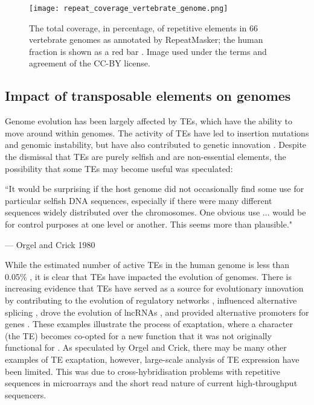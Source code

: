 \begin{figure}[!ht]
   \centering
   \texttt{[image: repeat\_coverage\_vertebrate\_genome.png]}
   \caption[Coverage of repetitive elements in vertebrate genomes]{The total coverage, in percentage, of repetitive elements in 66 vertebrate genomes as annotated by RepeatMasker; the human fraction is shown as a red bar \citep{tang2014repcoverage}. Image used under the terms and agreement of the CC-BY license.}
   \label{fig:repeat_coverage_vertebrate_genome}
\end{figure}

\subsection{Impact of transposable elements on genomes}

Genome evolution has been largely affected by TEs, which have the ability to move around within genomes. The activity of TEs have led to insertion mutations and genomic instability, but have also contributed to genetic innovation \citep{pmid19763152}. Despite the dismissal that TEs are purely selfish and are non-essential elements, the possibility that some TEs may become useful was speculated:

\epigraph{``It would be surprising if the host genome did not occasionally find some use for particular selfish DNA sequences, especially if there were many different sequences widely distributed over the chromosomes. One obvious use $\ldots$ would be for control purposes at one level or another. This seems more than plausible."}{--- \textup{Orgel and Crick 1980}}

While the estimated number of active TEs in the human genome is less than 0.05\% \citep{pmid17331616}, it is clear that TEs have impacted the evolution of genomes. There is increasing evidence that TEs have served as a source for evolutionary innovation by contributing to the evolution of regulatory networks \citep{pmid18368054}, influenced alternative splicing \citep{pmid18818740}, drove the evolution of lncRNAs \citep{pmid23637635}, and provided alternative promoters for genes \citep{pmid19577618}. These examples illustrate the process of exaptation, where a character (the TE) becomes co-opted for a new function that it was not originally functional for \citep{Gould01011982}. As speculated by Orgel and Crick, there may be many other examples of TE exaptation, however, large-scale analysis of TE expression have been limited. This was due to cross-hybridisation problems with repetitive sequences in microarrays and the short read nature of current high-throughput sequencers.

